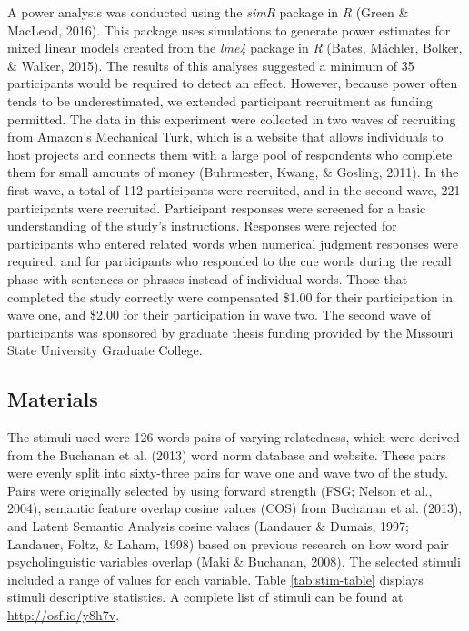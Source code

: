 \documentclass[english,,man]{apa6}
\begin{document}
A power analysis was conducted using the \emph{simR} package in \emph{R} (Green \& MacLeod, 2016). This package uses simulations to generate power estimates for mixed linear models created from the \emph{lme4} package in \emph{R} (Bates, Mächler, Bolker, \& Walker, 2015). The results of this analyses suggested a minimum of 35 participants would be required to detect an effect. However, because power often tends to be underestimated, we extended participant recruitment as funding permitted. The data in this experiment were collected in two waves of recruiting from Amazon's Mechanical Turk, which is a website that allows individuals to host projects and connects them with a large pool of respondents who complete them for small amounts of money (Buhrmester, Kwang, \& Gosling, 2011). In the first wave, a total of 112 participants were recruited, and in the second wave, 221 participants were recruited. Participant responses were screened for a basic understanding of the study's instructions. Responses were rejected for participants who entered related words when numerical judgment responses were required, and for participants who responded to the cue words during the recall phase with sentences or phrases instead of individual words. Those that completed the study correctly were compensated \$1.00 for their participation in wave one, and \$2.00 for their participation in wave two. The second wave of participants was sponsored by graduate thesis funding provided by the Missouri State University Graduate College.

\hypertarget{materials}{%
\subsection{Materials}\label{materials}}

The stimuli used were 126 words pairs of varying relatedness, which were derived from the Buchanan et al. (2013) word norm database and website. These pairs were evenly split into sixty-three pairs for wave one and wave two of the study. Pairs were originally selected by using forward strength (FSG; Nelson et al., 2004), semantic feature overlap cosine values (COS) from Buchanan et al. (2013), and Latent Semantic Analysis cosine values (Landauer \& Dumais, 1997; Landauer, Foltz, \& Laham, 1998) based on previous research on how word pair psycholinguistic variables overlap (Maki \& Buchanan, 2008). The selected stimuli included a range of values for each variable. Table \ref{tab:stim-table} displays stimuli descriptive statistics. A complete list of stimuli can be found at \url{http://osf.io/y8h7v}.
\end{document}
